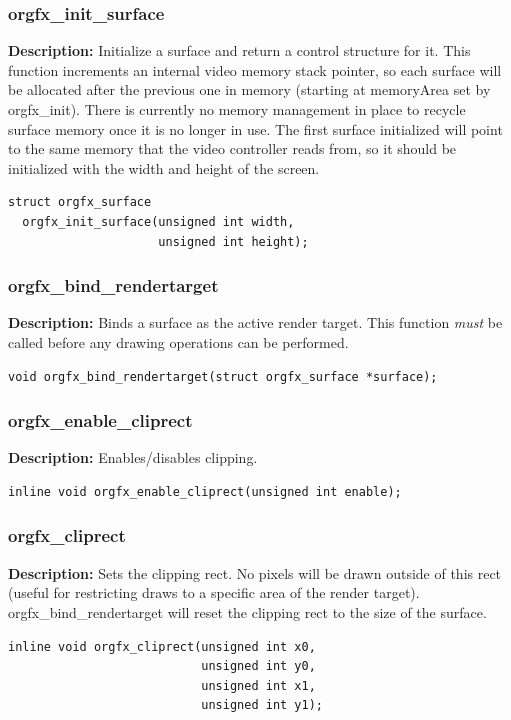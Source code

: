 \documentclass[10pt,a4paper]{article}
\begin{document}
\subsubsection{orgfx\_init\_surface}
\textbf{Description:} Initialize a surface and return a control structure for it. This function increments an internal video memory stack pointer, so each surface will be allocated after the previous one in memory (starting at memoryArea set by orgfx\_init). There is currently no memory management in place to recycle surface memory once it is no longer in use. The first surface initialized will point to the same memory that the video controller reads from, so it should be initialized with the width and height of the screen.
\begin{lstlisting}
struct orgfx_surface
  orgfx_init_surface(unsigned int width,
                     unsigned int height);
\end{lstlisting}

\subsubsection{orgfx\_bind\_rendertarget}
\textbf{Description:} Binds a surface as the active render target. This function \textit{must} be called before any drawing operations can be performed.
\begin{lstlisting}
void orgfx_bind_rendertarget(struct orgfx_surface *surface);
\end{lstlisting}

\subsubsection{orgfx\_enable\_cliprect}
\textbf{Description:} Enables/disables clipping.
\begin{lstlisting}
inline void orgfx_enable_cliprect(unsigned int enable);
\end{lstlisting}

\subsubsection{orgfx\_cliprect}
\textbf{Description:} Sets the clipping rect. No pixels will be drawn outside of this rect (useful for restricting draws to a specific area of the render target). orgfx\_bind\_rendertarget will reset the clipping rect to the size of the surface.
\begin{lstlisting}
inline void orgfx_cliprect(unsigned int x0,
                           unsigned int y0,
                           unsigned int x1,
                           unsigned int y1);
\end{lstlisting}
\end{document}
